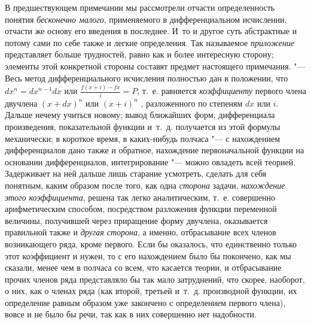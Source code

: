 В предшествующем примечании мы рассмотрели отчасти определенность понятия
{\em бесконечно малого}, применяемого в дифференциальном
исчислении, отчасти же основу его введения в последнее. И~то и другое суть
абстрактные и потому сами по себе также и легкие определения. Так
называемое {\em приложение} представляет больше
трудностей, равно как и более интересную сторону; элементы этой конкретной
стороны составят предмет настоящего примечания. "--- Весь метод
дифференциального исчисления полностью дан в положении, что
$dx^n=dx^{n-1}dx$ или
$\frac{f\left(x+i\right)-fx} i=P$, т.~е. равняется
{\em коэффициенту} первого члена двучлена
$(x+dx)^n$ или $(x+i)^n$
, разложенного по степеням $dx$ или $i$. Дальше нечему
учиться новому; вывод ближайших форм, дифференциала произведения,
показательной функции и~т.~д. получается из этой формулы механически; в
короткое время, в каких-нибудь полчаса "--- с нахождением дифференциалов дано
также и обратное, нахождение первоначальной функции на основании
дифференциалов, интегрирование "--- можно овладеть всей теорией. Задерживает на
ней дальше лишь старание усмотреть, сделать для себя понятным, каким
образом после того, как одна {\em сторона} задачи,
{\em нахождение этого коэффициента}, решена так легко
аналитическим, т.~е. совершенно арифметическим способом, посредством
разложения функции переменной величины, получившей через приращение форму
двучлена, оказывается правильной также и {\em другая
сторона}, а именно, отбрасывание всех членов возникающего ряда, кроме
первого. Если бы оказалось, что единственно только этот коэффициент и нужен,
то с его нахождением было бы покончено, как мы сказали, менее чем в полчаса
со всем, что касается теории, и отбрасывание прочих членов ряда
представляло бы так мало затруднений, что скорее, наоборот, о них, как о
членах ряда (как второй, третьей и~т.~д. производной функции, их
определение равным образом уже закончено с определением первого члена),
вовсе и не было бы речи, так как в них совершенно нет надобности.

